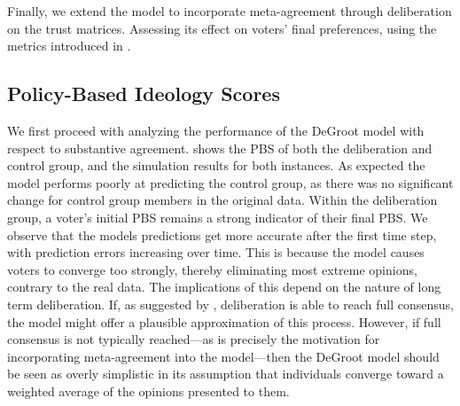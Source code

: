 
Finally, we extend the model to incorporate meta-agreement through deliberation on the trust matrices. Assessing its effect on voters’ final preferences, using the metrics introduced in .

\subsection{Policy-Based Ideology Scores}

We first proceed with analyzing the performance of the DeGroot model with
respect to substantive agreement.  shows the PBS of both the
deliberation and control group, and the simulation results for both instances.
As expected the model performs poorly at predicting the control group, as there
was no significant change for control group members in the original data.
Within the deliberation group, a voter's initial PBS remains a strong indicator
of their final PBS. We observe that the models predictions get more accurate
after the first time step, with prediction errors increasing over time. This is
because the model causes voters to converge too strongly, thereby eliminating
most extreme opinions, contrary to the real data. The implications of this
depend on the nature of long term deliberation. If, as suggested by
\citet{elsterMarketForumThree2002}, deliberation is able to reach full
consensus, the model might offer a plausible approximation of this process.
However, if full consensus is not typically reached—as is precisely the
motivation for incorporating meta-agreement into the model—then the DeGroot
model should be seen as overly simplistic in its assumption that individuals
converge toward a weighted average of the opinions presented to them.

